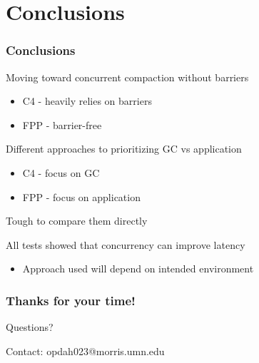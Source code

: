 \documentclass{beamer}
\newcommand{\linespace}{\vskip 0.25cm}
\begin{document}
\section[Conclusions]{Conclusions}

%
%
%
%
%

\begin{frame}

\frametitle{Conclusions}

Moving toward concurrent compaction without barriers
\begin{itemize}
\item C4 - heavily relies on barriers
\item FPP - barrier-free
\end{itemize}

\linespace
\linespace

Different approaches to prioritizing GC vs application
\begin{itemize}
\item C4 - focus on GC
\item FPP - focus on application
\end{itemize}

\linespace
\linespace

Tough to compare them directly

\linespace
\linespace

All tests showed that concurrency can improve latency
\begin{itemize}
\item Approach used will depend on intended environment
\end{itemize}

\end{frame}

\begin{frame}
	\frametitle{Thanks for your time!}
	
	\begin{center}
	{\huge Questions?}
	\end{center}	
	
	\linespace
	\linespace	
	
	\begin{center}
	Contact: opdah023@morris.umn.edu
	\end{center}
	
\end{frame}
\end{document}

